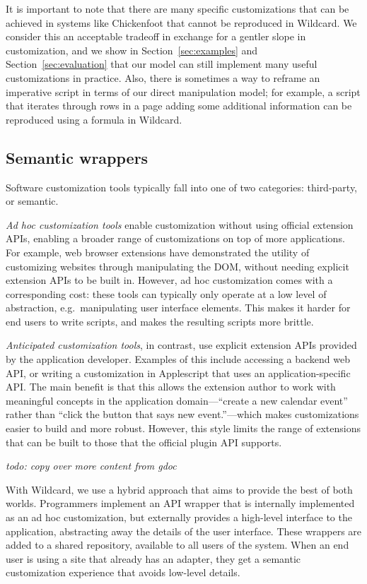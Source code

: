 \documentclass[sigplan,10pt,anonymous,review]{acmart}
\begin{document}
It is important to note that there are many specific customizations that
can be achieved in systems like Chickenfoot \citep{bolin2005} that
cannot be reproduced in Wildcard. We consider this an acceptable
tradeoff in exchange for a gentler slope in customization, and we show
in Section~\ref{sec:examples} and Section~\ref{sec:evaluation} that our
model can still implement many useful customizations in practice. Also,
there is sometimes a way to reframe an imperative script in terms of our
direct manipulation model; for example, a script that iterates through
rows in a page adding some additional information can be reproduced
using a formula in Wildcard.

\hypertarget{semantic-wrappers}{%
\subsection{Semantic wrappers}\label{semantic-wrappers}}

Software customization tools typically fall into one of two categories:
third-party, or semantic.

\emph{Ad hoc customization tools} enable customization without using
official extension APIs, enabling a broader range of customizations on
top of more applications. For example, web browser extensions have
demonstrated the utility of customizing websites through manipulating
the DOM, without needing explicit extension APIs to be built in.
However, ad hoc customization comes with a corresponding cost: these
tools can typically only operate at a low level of abstraction,
e.g.~manipulating user interface elements. This makes it harder for end
users to write scripts, and makes the resulting scripts more brittle.

\emph{Anticipated customization tools}, in contrast, use explicit
extension APIs provided by the application developer. Examples of this
include accessing a backend web API, or writing a customization in
Applescript that uses an application-specific API. The main benefit is
that this allows the extension author to work with meaningful concepts
in the application domain---``create a new calendar event'' rather than
``click the button that says new event.''---which makes customizations
easier to build and more robust. However, this style limits the range of
extensions that can be built to those that the official plugin API
supports.

\emph{todo: copy over more content from gdoc}

With Wildcard, we use a hybrid approach that aims to provide the best of
both worlds. Programmers implement an API wrapper that is internally
implemented as an ad hoc customization, but externally provides a
high-level interface to the application, abstracting away the details of
the user interface. These wrappers are added to a shared repository,
available to all users of the system. When an end user is using a site
that already has an adapter, they get a semantic customization
experience that avoids low-level details.
\end{document}

